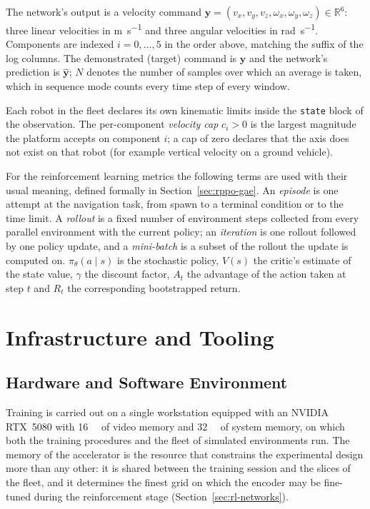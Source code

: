 The network's output is a velocity command
$\mathbf{y} = (v_x, v_y, v_z, \omega_x, \omega_y, \omega_z) \in \mathbb{R}^{6}$:
three linear velocities in \si{\metre\per\second} and three angular velocities
in \si{\radian\per\second}. Components are indexed $i = 0,\dots,5$ in the order
above, matching the  suffix of the log columns. The demonstrated
(target) command is $\mathbf{y}$ and the network's prediction is
$\hat{\mathbf{y}}$; $N$ denotes the number of samples over which an average is
taken, which in sequence mode counts every time step of every window.

Each robot in the fleet declares its own kinematic limits inside the
\texttt{state} block of the observation. The per-component \emph{velocity cap}
$c_i > 0$ is the largest magnitude the platform accepts on component $i$;
a cap of zero declares that the axis does not exist on that robot (for example
vertical velocity on a ground vehicle).

For the reinforcement learning metrics the following terms are used with their
usual meaning, defined formally in Section~\ref{sec:rppo-gae}. An
\emph{episode} is one attempt at the navigation task, from spawn to a terminal
condition or to the time limit. A \emph{rollout} is a fixed number of
environment steps collected from every parallel environment with the current
policy; an \emph{iteration} is one rollout followed by one policy update, and
a \emph{mini-batch} is a subset of the rollout the update is computed on.
$\pi_\theta(a \mid s)$ is the stochastic policy, $V(s)$ the critic's estimate of
the state value, $\gamma$ the discount factor, $A_t$ the advantage of the action
taken at step $t$ and $R_t$ the corresponding bootstrapped return.

\section{Infrastructure and Tooling}
\label{sec:exp-tooling}

\subsection{Hardware and Software Environment}

Training is carried out on a single workstation equipped with an NVIDIA RTX~5080
with \SI{16}{\gibi\byte} of video memory and \SI{32}{\gibi\byte} of system
memory, on which both the training procedures and the fleet of simulated
environments run. The memory of the accelerator is the resource that constrains
the experimental design more than any other: it is shared between the training
session and the slices of the fleet, and it determines the finest grid on which
the encoder may be fine-tuned during the reinforcement stage
(Section~\ref{sec:rl-networks}).

